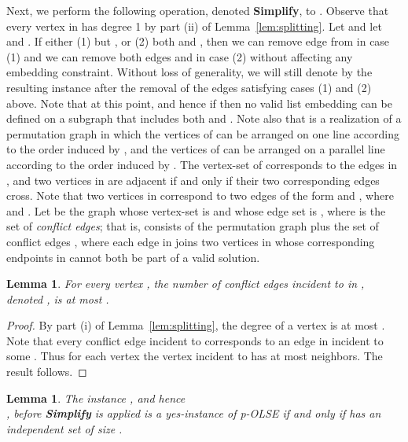 \documentclass[11pt]{article}
\newtheorem{lemma}[theorem]{Lemma}
\begin{document}
Next, we perform the following operation, denoted {\bf Simplify}, to . Observe that every vertex in  has degree 1 by part (ii) of Lemma~\ref{lem:splitting}. Let  and let  and . If either (1)  but , or (2) both  and , then we can remove edge  from  in case (1) and we can remove both edges  and  in case (2) without affecting any embedding constraint. Without loss of generality, we will still denote by  the resulting instance after the removal of the edges satisfying cases (1) and (2) above. Note that  at this point, and hence if  then no valid list embedding can be defined on a subgraph that includes both  and . Note also that  is a realization of a permutation graph  in which the vertices of  can be arranged on one line according to the order induced by , and the vertices of  can be arranged on a parallel line according to the order induced by . The vertex-set of  corresponds to the edges in , and two vertices in  are adjacent if and only if their two corresponding edges cross. Note that two vertices in  correspond to two edges of the form  and , where  and .
Let  be the graph whose vertex-set is  and whose edge set is , where  is the set of {\em conflict edges}; that is,  consists of the permutation graph  plus the set of conflict edges , where each edge in  joins two vertices in  whose corresponding endpoints in  cannot both be part of a valid solution.

\begin{lemma}
\label{lem:boundedconflictdegree}
For every vertex , the number of conflict edges incident to  in , denoted , is at most .
\end{lemma}

\begin{proof}
By part (i) of Lemma~\ref{lem:splitting}, the degree of a vertex  is at most .  Note that every conflict edge incident to  corresponds to an edge in  incident to some .  Thus for each vertex  the vertex  incident to  has at most  neighbors.  The result follows.
\end{proof}


\begin{lemma}
\label{lem:equivalence}
The instance , and hence \\ , before {\bf Simplify} is applied is a yes-instance of p-OLSE if and only if  has an independent set of size .
\end{lemma}
\end{document}
